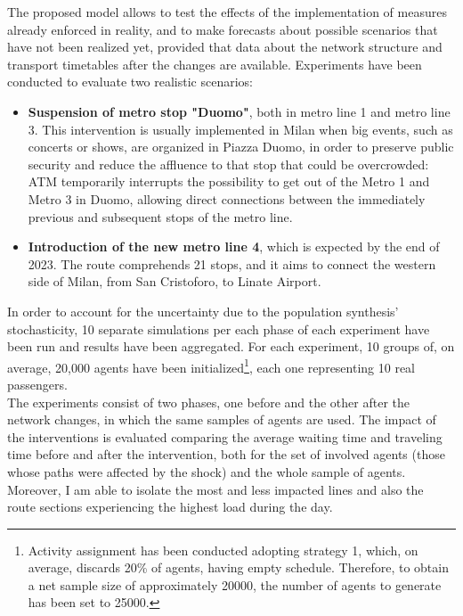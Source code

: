 The proposed model allows to test the effects of the implementation of measures already enforced in reality, and to make forecasts about possible scenarios that have not been realized yet, provided that data about the network structure and transport timetables after the changes are available.
Experiments have been conducted to evaluate two realistic scenarios:
\begin{itemize}
    \item \textbf{Suspension of metro stop "Duomo"}, both in metro line 1 and metro line 3. This intervention is usually implemented in Milan when big events, such as concerts or shows, are organized in Piazza Duomo, in order to preserve public security and reduce the affluence to that stop that could be overcrowded: ATM temporarily interrupts the possibility to get out of the Metro 1 and Metro 3 in Duomo, allowing direct connections between the immediately previous and subsequent stops of the metro line.  
    \item \textbf{Introduction of the new metro line 4}, which is expected by the end of 2023. The route comprehends 21 stops, and it aims to connect the western side of Milan, from San Cristoforo, to Linate Airport.
\end{itemize}
In order to account for the uncertainty due to the population synthesis' stochasticity, 10 separate simulations per each phase of each experiment have been run and results have been aggregated. For each experiment, 10 groups of, on average, 20,000 agents have been initialized\footnote{Activity assignment has been conducted adopting strategy 1, which, on average, discards 20\% of agents, having empty schedule. Therefore, to obtain a net sample size of approximately 20000, the number of agents to generate has been set to 25000.}, each one representing 10 real passengers. \\
The experiments consist of two phases, one before and the other after the network changes, in which the same samples of agents are used. The impact of the interventions is evaluated comparing the average waiting time and traveling time before and after the intervention, both for the set of involved agents (those whose paths were affected by the shock) and the whole sample of agents. Moreover, I am able to isolate the most and less impacted lines and also the route sections experiencing the highest load during the day.
